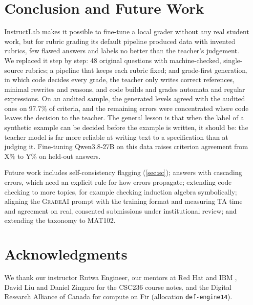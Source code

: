 \documentclass[11pt,a4paper]{article}
\newif\ifdraft
\newcommand{\todo}[2]{%
  \ifdraft\textcolor{red}{\textbf{[TODO #1:} #2\textbf{]}}\fi}
\newcommand{\ph}[1]{\ifdraft\textcolor{blue!70!black}{#1}\else #1\fi}
\newcommand{\gradeai}{\textsc{GradeAI}}
\newcommand{\file}[1]{\nolinkurl{#1}}
\theoremstyle{definition}
\begin{document}
\section{Conclusion and Future Work}\label{sec:conclusion}
InstructLab makes it possible to fine-tune a local grader without any real student work, but for rubric grading its default pipeline produced data with invented rubrics, few flawed answers and labels no better than the teacher's judgement. We replaced it step by step: 48 original questions with machine-checked, single-source rubrics; a pipeline that keeps each rubric fixed; and grade-first generation, in which code decides every grade, the teacher only writes correct references, minimal rewrites and reasons, and code builds and grades automata and regular expressions. On an audited sample, the generated levels agreed with the audited ones on 97.7\% of criteria, and the remaining errors were concentrated where code leaves the decision to the teacher. The general lesson is that when the label of a synthetic example can be decided before the example is written, it should be: the teacher model is far more reliable at writing text to a specification than at judging it.
\ph{Fine-tuning Qwen3.8-27B on this data raises criterion agreement from X\% to Y\% on held-out answers.}

Future work includes self-consistency flagging (\cref{sec:sc}); answers with cascading errors, which need an explicit rule for how errors propagate; extending code checking to more topics, for example checking induction algebra symbolically; aligning the \gradeai{} prompt with the training format and measuring TA time and agreement on real, consented submissions under institutional review; and extending the taxonomy to MAT102.

\section*{Acknowledgments}
We thank our instructor Rutwa Engineer, our mentors at Red Hat and IBM \todo{}{names}, David Liu and Daniel Zingaro for the CSC236 course notes, and the Digital Research Alliance of Canada for compute on Fir (allocation \file{def-engine14}).
\end{document}
